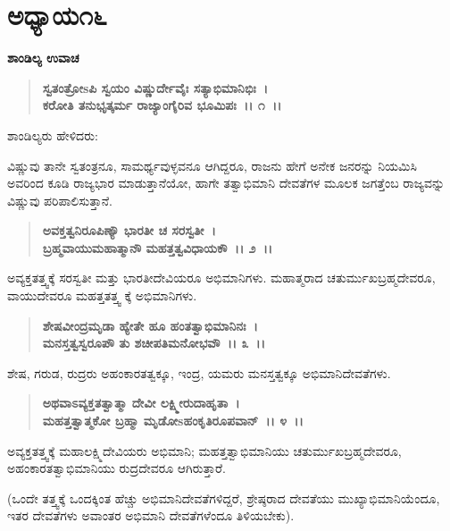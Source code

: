 \newpage

\section*{ಅಧ್ಯಾಯ\enginline{-}೧೬}

\emptypage

\begin{flushleft}
\textbf{ಶಾಂಡಿಲ್ಯ ಉವಾಚ \enginline{-}}
\end{flushleft}

\begin{verse}
\textbf{ಸ್ವತಂತ್ರೋsಪಿ ಸ್ವಯಂ ವಿಷ್ಣುರ್ದೇವೈಃ ಸತ್ಯಾಭಿಮಾನಿಭಿಃ~।}\\\textbf{ಕರೋತಿ ತನುಭೃತ್ಕರ್ಮ ರಾಜ್ಯಾಂಗೈರಿವ ಭೂಮಿಪಃ~।। ೧~।।}
\end{verse}

\begin{flushleft}
ಶಾಂಡಿಲ್ಯರು ಹೇಳಿದರು:
\end{flushleft}

ವಿಷ್ಣುವು ತಾನೇ ಸ್ವತಂತ್ರನೂ, ಸಾಮರ್ಥ್ಯವುಳ್ಳವನೂ ಆಗಿದ್ದರೂ, ರಾಜನು ಹೇಗೆ ಅನೇಕ ಜನರನ್ನು ನಿಯಮಿಸಿ ಅವರಿಂದ ಕೂಡಿ ರಾಜ್ಯಭಾರ ಮಾಡುತ್ತಾನೆಯೋ, ಹಾಗೇ ತತ್ವಾಭಿಮಾನಿ ದೇವತೆಗಳ ಮೂಲಕ ಜಗತ್ತೆಂಬ ರಾಜ್ಯವನ್ನು ವಿಷ್ಣುವು ಪರಿಪಾಲಿಸುತ್ತಾನೆ.

\begin{verse}
\textbf{ಅವಕ್ತತ್ವನಿರೂಪಿಣ್ಯೌ ಭಾರತೀ ಚ ಸರಸ್ವತೀ~।}\\\textbf{ಬ್ರಹ್ಮವಾಯುಮಹಾತ್ಮಾನೌ ಮಹತ್ತತ್ವವಿಧಾಯಕೌ~।। ೨~।।}
\end{verse}

ಅವ್ಯಕ್ತತತ್ತ್ವಕ್ಕೆ ಸರಸ್ವತೀ ಮತ್ತು ಭಾರತೀದೇವಿಯರೂ ಅಭಿಮಾನಿಗಳು. ಮಹಾತ್ಮರಾದ ಚತುರ್ಮುಖಬ್ರಹ್ಮದೇವರೂ, ವಾಯುದೇವರೂ ಮಹತ್ತತತ್ತ್ವ ಕ್ಕೆ ಅಭಿಮಾನಿಗಳು.

\begin{verse}
\textbf{ಶೇಷವೀಂದ್ರಮೃಡಾ ಹ್ಯೇತೇ ಹೂ ಹಂತತ್ವಾಭಿಮಾನಿನಃ~।}\\\textbf{ಮನಸ್ತತ್ವಸ್ವರೂಪೌ ತು ಶಚೀಪತಿಮನೋಭವೌ~।। ೩~।।}
\end{verse}

ಶೇಷ, ಗರುಡ, ರುದ್ರರು ಅಹಂಕಾರತತ್ವಕ್ಕೂ, ಇಂದ್ರ, ಯಮರು ಮನಸ್ತತ್ವಕ್ಕೂ ಅಭಿಮಾನಿದೇವತೆಗಳು.

\begin{verse}
\textbf{ಅಥವಾಽವ್ಯಕ್ತತತ್ವಾತ್ಮಾ ದೇವೀ ಲಕ್ಷ್ಮೀರುದಾಹೃತಾ~।}\\\textbf{ಮಹತ್ತತ್ವಾತ್ಮಕೋ ಬ್ರಹ್ಮಾ ಮೃಡೋsಹಂಕೃತಿರೂಪವಾನ್~।। ೪~।।}
\end{verse}

ಅವ್ಯಕ್ತತತ್ತ್ವಕ್ಕೆ ಮಹಾಲಕ್ಷ್ಮಿದೇವಿಯರು ಅಭಿಮಾನಿ; ಮಹತ್ತತ್ವಾಭಿಮಾನಿಯು ಚತು\-ರ್ಮುಖಬ್ರಹ್ಮದೇವರೂ, ಅಹಂಕಾರತತ್ವಾಭಿಮಾನಿಯು ರುದ್ರದೇವರೂ ಆಗಿರುತ್ತಾರೆ.

(ಒಂದೇ ತತ್ತ್ವಕ್ಕೆ ಒಂದಕ್ಕಿಂತ ಹೆಚ್ಚು ಅಭಿಮಾನಿದೇವತೆಗಳಿದ್ದರೆ, ಶ್ರೇಷ್ಠರಾದ ದೇವತೆಯು ಮುಖ್ಯಾಭಿಮಾನಿಯೆಂದೂ, ಇತರ ದೇವತೆಗಳು ಅವಾಂತರ ಅಭಿಮಾನಿ ದೇವತೆಗಳೆಂದೂ ತಿಳಿಯಬೇಕು).

